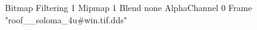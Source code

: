 {Bitmap
	{Filtering 1}
	{Mipmap 1}
	{Blend none}
	{AlphaChannel 0}
	{Frame "roof__soloma_4u#win.tif.dds"}
}
